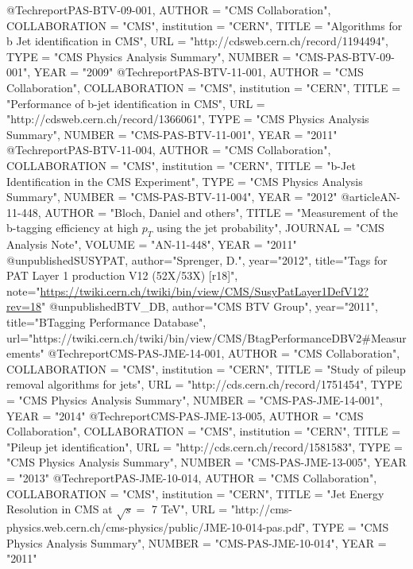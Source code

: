 @Techreport{PAS-BTV-09-001,
      AUTHOR      = "{CMS Collaboration}",
      COLLABORATION = "{CMS}",
      institution    = "CERN",
      TITLE       = "Algorithms for b Jet identification in CMS",
      URL         = "http://cdsweb.cern.ch/record/1194494",
      TYPE        = "CMS Physics Analysis Summary",
      NUMBER      = "CMS-PAS-BTV-09-001",
      YEAR        = "2009"
}
@Techreport{PAS-BTV-11-001,
      AUTHOR      = "{CMS Collaboration}",
      COLLABORATION = "{CMS}",
      institution    = "CERN",
      TITLE       = "Performance of b-jet identification in CMS",
      URL         = "http://cdsweb.cern.ch/record/1366061",
      TYPE        = "CMS Physics Analysis Summary",
      NUMBER      = "CMS-PAS-BTV-11-001",
      YEAR        = "2011"
}
@Techreport{PAS-BTV-11-004,
      AUTHOR      = "{CMS Collaboration}",
      COLLABORATION = "{CMS}",
      institution    = "CERN",
      TITLE       = "b-Jet Identification in the CMS Experiment",
      TYPE        = "CMS Physics Analysis Summary",
      NUMBER      = "CMS-PAS-BTV-11-004",
      YEAR        = "2012"
}
@article{AN-11-448,
AUTHOR = "{Bloch, Daniel and others}",
TITLE = "Measurement of the b-tagging efficiency at high $p_{T}$ using the jet probability",
JOURNAL = "CMS Analysis Note",
VOLUME = "AN-11-448",
YEAR = "2011"
}
@unpublished{SUSYPAT,
author="{Sprenger, D.}",
year="2012",
title="Tags for PAT Layer 1 production V12 (52X/53X) [r18]",
note="\url{https://twiki.cern.ch/twiki/bin/view/CMS/SusyPatLayer1DefV12?rev=18}"
}
@unpublished{BTV_DB,
author="CMS BTV Group",
year="2011",
title="BTagging Performance Database",
url="https://twiki.cern.ch/twiki/bin/view/CMS/BtagPerformanceDBV2#Measurements"
}
@Techreport{CMS-PAS-JME-14-001,
      AUTHOR      = "{CMS Collaboration}",
      COLLABORATION = "{CMS}",
      institution    = "CERN",
      TITLE       = "Study of pileup removal algorithms for jets",
      URL         = "http://cds.cern.ch/record/1751454",
      TYPE        = "CMS Physics Analysis Summary",
      NUMBER      = "CMS-PAS-JME-14-001",
      YEAR        = "2014"
}
@Techreport{CMS-PAS-JME-13-005,
      AUTHOR      = "{CMS Collaboration}",
      COLLABORATION = "{CMS}",
      institution    = "CERN",
      TITLE       = "Pileup jet identification",
      URL         = "http://cds.cern.ch/record/1581583",
      TYPE        = "CMS Physics Analysis Summary",
      NUMBER      = "CMS-PAS-JME-13-005",
      YEAR        = "2013"
}
@Techreport{PAS-JME-10-014,
      AUTHOR      = "{CMS Collaboration}",
      COLLABORATION = "{CMS}",
      institution    = "CERN",
      TITLE       = "Jet Energy Resolution in CMS at $\sqrt{s} =$ 7 TeV",
      URL         = "http://cms-physics.web.cern.ch/cms-physics/public/JME-10-014-pas.pdf",
      TYPE        = "CMS Physics Analysis Summary",
      NUMBER      = "CMS-PAS-JME-10-014",
      YEAR        = "2011"
}
